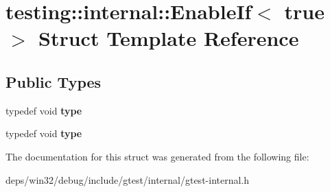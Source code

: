 \hypertarget{structtesting_1_1internal_1_1_enable_if_3_01true_01_4}{}\section{testing\+:\+:internal\+:\+:Enable\+If$<$ true $>$ Struct Template Reference}
\label{structtesting_1_1internal_1_1_enable_if_3_01true_01_4}
\subsection*{Public Types}
\begin{DoxyCompactItemize}
\item 
\hypertarget{structtesting_1_1internal_1_1_enable_if_3_01true_01_4_a9398d803f1fdd99ff41823746f6299ff}{}typedef void {\bfseries type}\label{structtesting_1_1internal_1_1_enable_if_3_01true_01_4_a9398d803f1fdd99ff41823746f6299ff}

\item 
\hypertarget{structtesting_1_1internal_1_1_enable_if_3_01true_01_4_a9398d803f1fdd99ff41823746f6299ff}{}typedef void {\bfseries type}\label{structtesting_1_1internal_1_1_enable_if_3_01true_01_4_a9398d803f1fdd99ff41823746f6299ff}

\end{DoxyCompactItemize}


The documentation for this struct was generated from the following file\+:\begin{DoxyCompactItemize}
\item 
deps/win32/debug/include/gtest/internal/gtest-\/internal.\+h\end{DoxyCompactItemize}
